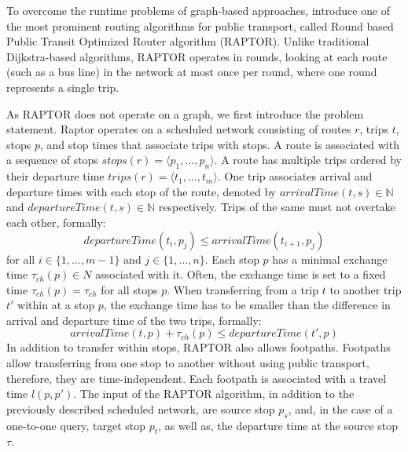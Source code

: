 To overcome the runtime problems of graph-based approaches,  introduce one of the most prominent routing algorithms for public transport, called Round based Public Transit Optimized Router algorithm (RAPTOR). %
Unlike traditional Dijkstra-based algorithms, RAPTOR operates in rounds, looking at each route (such as a bus line) in the network at most once per round, where one round represents a single trip.

As RAPTOR does not operate on a graph, we first introduce the problem statement.
Raptor operates on a scheduled network consisting of routes \(r\), trips \(t\), stops \(p\), and stop times that associate trips with stops.
A route is associated with a sequence of stops \(stops(r) = \langle p_1, \dots, p_n \rangle\).
A route has multiple trips ordered by their departure time \(trips(r) = \langle t_1, \dots, t_m \rangle\).
One trip associates arrival and departure times with each stop of the route, denoted by \(arrivalTime(t, s) \in \mathbb{N}\) and \(departureTime(t, s) \in \mathbb{N}\) respectively.
Trips of the same must not overtake each other, formally:
\[departureTime(t_i, p_j) \leq arrivalTime(t_{i+1}, p_j)\]
for all \(i \in \{1, \dots, m-1\}\) and \(j \in \{1, \dots, n\}\).
Each stop \(p\) has a minimal exchange time \(\tau_{ch}(p) \in N\) associated with it.
Often, the exchange time is set to a fixed time \(\tau_{ch}(p) = \tau_{ch}\) for all stops \(p\).
When transferring from a trip \(t\) to another trip \(t'\) within at a stop \(p\), the exchange time has to be smaller than the difference in arrival and departure time of the two trips, formally:
\[arrivalTime(t, p) + \tau_{ch}(p) \leq departureTime(t', p) \]
In addition to transfer within stops, RAPTOR also allows footpaths.
Footpaths allow transferring from one stop to another without using public transport, therefore, they are time-independent.
Each footpath is associated with a travel time \(l(p, p')\).
The input of the RAPTOR algorithm, in addition to the previously described scheduled network, are source stop \(p_s\), and, in the case of a one-to-one query, target stop \(p_t\), as well as, the departure time at the source stop \(\tau\).

